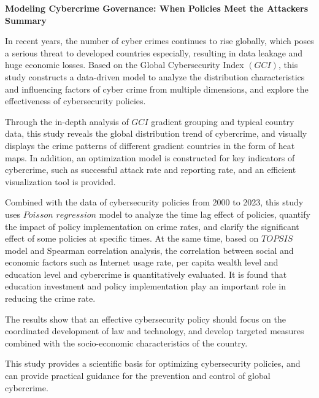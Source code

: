 \documentclass[12pt]{article}
\begin{document}
\begin{center}
	\fontsize{16}{19}\selectfont \textbf{Modeling Cybercrime Governance: When Policies Meet the Attackers} \\
	\bigskip
	\fontsize{16}{19}\selectfont \textbf{Summary} \\
\end{center}
\begin{adjustwidth}{2em}{2em}
	\hspace*{1.5em} In recent years, the number of cyber crimes continues to rise globally,
	which poses a serious threat to developed countries especially, resulting in data leakage and huge economic losses.
	Based on the Global Cybersecurity Index $(GCI)$,
	this study constructs a data-driven model to analyze the distribution characteristics and influencing factors of cyber crime from multiple dimensions,
	and explore the effectiveness of cybersecurity policies.

	Through the in-depth analysis of $GCI$ gradient grouping and typical country data,
	this study reveals the global distribution trend of cybercrime,
	and visually displays the crime patterns of different gradient countries in the form of heat maps.
	In addition, an optimization model is constructed for key indicators of cybercrime,
	such as successful attack rate and reporting rate, and an efficient visualization tool is provided.

	Combined with the data of cybersecurity policies from 2000 to 2023,
	this study uses $Poisson$ $regression$ model to analyze the time lag effect of policies, quantify the impact of policy implementation on crime rates,
	and clarify the significant effect of some policies at specific times.
	At the same time, based on $TOPSIS$ model and Spearman correlation analysis,
	the correlation between social and economic factors such as Internet usage rate, per capita wealth level and education level and cybercrime is quantitatively evaluated.
	It is found that education investment and policy implementation play an important role in reducing the crime rate.

	The results show that an effective cybersecurity policy should focus on the coordinated development of law and technology,
	and develop targeted measures combined with the socio-economic characteristics of the country.

	This study provides a scientific basis for optimizing cybersecurity policies,
	and can provide practical guidance for the prevention and control of global cybercrime.


\end{adjustwidth}
\end{document}
